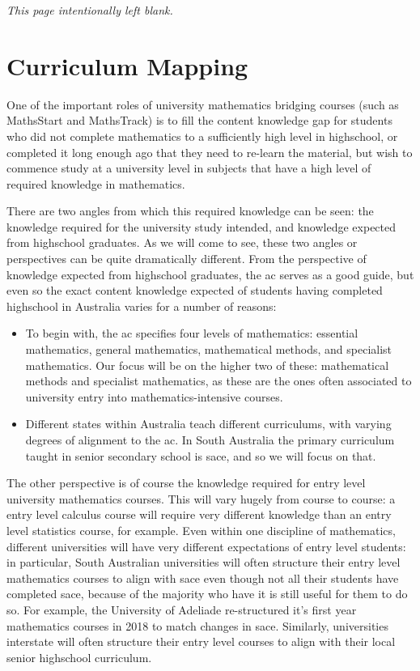 \documentclass[twoside,12pt,a4paper]{report}
\makeatletter
\newcommand*{\intentionallyblankpage}{
  \vspace*{\fill}
  {\centering \textit{This page intentionally left blank.} \par}
  \vspace{\fill}}
\renewcommand*{\cleardoublepage}{\clearpage\if@twoside \ifodd\c@page\else
  \intentionallyblankpage
  \newpage
  \if@twocolumn\hbox{}\newpage\fi\fi\fi}
\makeatother
\begin{document}
\cleardoublepage
\chapter{Curriculum Mapping}
\label{chap:curriculum}

One of the important roles of university mathematics bridging courses (such as MathsStart and MathsTrack) is to fill the content knowledge gap for students who did not complete mathematics to a sufficiently high level in highschool, or completed it long enough ago that they need to re-learn the material, but wish to commence study at a university level in subjects that have a high level of required knowledge in mathematics. 

There are two angles from which this required knowledge can be seen: the knowledge required for the university study intended, and knowledge expected from highschool graduates. As we will come to see, these two angles or perspectives can be quite dramatically different. From the perspective of knowledge expected from highschool graduates, the \gls{ac} serves as a good guide, but even so the exact content knowledge expected of students having completed highschool in Australia varies for a number of reasons:
\begin{itemize}
	\item To begin with, the \gls{ac} specifies four levels of mathematics: essential mathematics, general mathematics, mathematical methods, and specialist mathematics. Our focus will be on the higher two of these: mathematical methods and specialist mathematics, as these are the ones often associated to university entry into mathematics-intensive courses. 
	\item Different states within Australia teach different curriculums, with varying degrees of alignment to the \gls{ac}. In South Australia the primary curriculum taught in senior secondary school is \gls{sace}, and so we will focus on that.
\end{itemize}
The other perspective is of course the knowledge required for entry level university mathematics courses. This will vary hugely from course to course: a entry level calculus course will require very different knowledge than an entry level statistics course, for example. Even within one discipline of mathematics, different universities will have very different expectations of entry level students: in particular, South Australian universities will often structure their entry level mathematics courses to align with \gls{sace} even though not all their students have completed \gls{sace}, because of the majority who have it is still useful for them to do so. For example, the University of Adeliade re-structured it's first year mathematics courses in 2018 to match changes in \gls{sace}. Similarly, universities interstate will often structure their entry level courses to align with their local senior highschool curriculum. 
\end{document}
